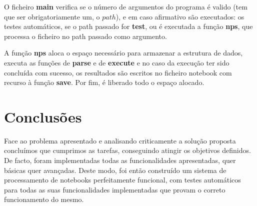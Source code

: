 \documentclass[a4paper]{article}
\begin{document}
O ficheiro \textbf{main} verifica se o número de argumentos do programa é valido
(tem que ser obrigatoriamente um, o $path$), e em caso afirmativo são executados:
os testes automáticos, se o path passado for \textbf{test}, ou é executada a função
\textbf{nps}, que processa o ficheiro no path passado como argumento.

A função \textbf{nps} aloca o espaço necessário para armazenar a estrutura de dados,
executa as funções de \textbf{parse} e de \textbf{execute} e no caso
da execução ter sido concluída com sucesso, os resultados
são escritos no ficheiro notebook com recurso à função \textbf{save}. Por fim,
é liberado todo o espaço alocado.



\section{Conclusões}
\label{sec:conclusao}

Face ao problema apresentado e analisando criticamente a solução proposta
concluímos que cumprimos as tarefas, conseguindo atingir os objetivos definidos.
De facto, foram implementadas todas as funcionalidades apresentadas, quer
básicas quer avançadas.
Deste modo, foi então construído um sistema de processamento de notebooks
perfeitamente funcional, com testes automáticos para todas as suas
funcionalidades implementadas que provam o correto funcionamento do mesmo.
\end{document}
